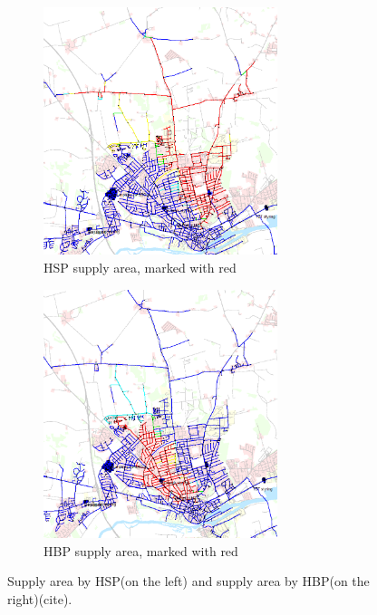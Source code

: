 \begin{figure}[H]
\centering
\begin{subfigure}{.49\textwidth}
\centering
  \includegraphics[width=0.75\textwidth]{report/pictures/HBP_HSP_distribution}
  \caption{HSP supply area, marked with red}
  \label{fig:HSP_HBP_EPA1}
\end{subfigure}
\begin{subfigure}{.49\textwidth}
\centering
  \includegraphics[width=0.75\textwidth]{report/pictures/HBP_HSP_distribution1}
  \caption{HBP supply area, marked with red}
  \label{fig:HSP_HBP_EPA2}
\end{subfigure}
\caption{Supply area by HSP(on the left) and supply area by HBP(on the right)(cite).}
\label{fig:HSP_HBP_EPA}
\end{figure}

